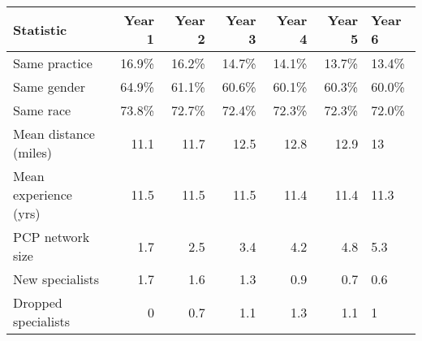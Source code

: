 \begin{table}[!h]
\centering
\begin{tabular}{lrrrrrl}
\toprule
Statistic & Year 1 & Year 2 & Year 3 & Year 4 & Year 5 & Year 6\\
\midrule
Same practice & 16.9\% & 16.2\% & 14.7\% & 14.1\% & 13.7\% & 13.4\%\\
Same gender & 64.9\% & 61.1\% & 60.6\% & 60.1\% & 60.3\% & 60.0\%\\
Same race & 73.8\% & 72.7\% & 72.4\% & 72.3\% & 72.3\% & 72.0\%\\
Mean distance (miles) & 11.1 & 11.7 & 12.5 & 12.8 & 12.9 & 13\\
Mean experience (yrs) & 11.5 & 11.5 & 11.5 & 11.4 & 11.4 & 11.3\\
\addlinespace
PCP network size & 1.7 & 2.5 & 3.4 & 4.2 & 4.8 & 5.3\\
New specialists & 1.7 & 1.6 & 1.3 & 0.9 & 0.7 & 0.6\\
Dropped specialists & 0 & 0.7 & 1.1 & 1.3 & 1.1 & 1\\
\bottomrule
\end{tabular}
\end{table}
